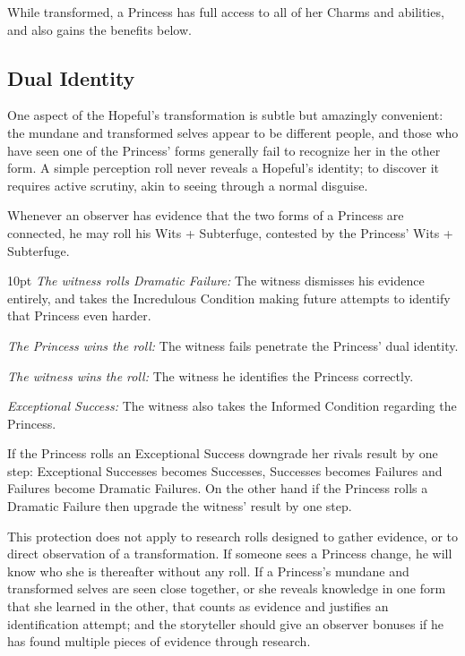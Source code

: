 While transformed, a Princess has full access to all of her Charms and abilities, and also gains the benefits below. 

\subsection*{Dual Identity}
One aspect of the Hopeful's transformation is subtle but amazingly convenient: the mundane and transformed selves appear to be different people, and those who have seen one of the Princess' forms generally fail to recognize her in the other form. A simple perception roll never reveals a Hopeful's identity; to discover it requires active scrutiny, akin to seeing through a normal disguise.

Whenever an observer has evidence that the two forms of a Princess are connected, he may roll his Wits + Subterfuge, contested by the Princess' Wits + Subterfuge. 

\begin{myindentpar}{10pt}
    \emph{The witness rolls Dramatic Failure:} The witness dismisses his evidence entirely, and takes the Incredulous Condition making future attempts to identify that Princess even harder. 
    
    \emph{The Princess wins the roll:} The witness fails penetrate the Princess' dual identity. 
    
    \emph{The witness wins the roll:} The witness he identifies the Princess correctly.
    
    \emph{Exceptional Success:} The witness also takes the Informed Condition regarding the Princess. 
\end{myindentpar}

If the Princess rolls an Exceptional Success downgrade her rivals result by one step: Exceptional Successes becomes Successes, Successes becomes Failures and Failures become Dramatic Failures. On the other hand if the Princess rolls a Dramatic Failure then upgrade the witness' result by one step.

This protection does not apply to research rolls designed to gather evidence, or to direct observation of a transformation. If someone sees a Princess change, he will know who she is thereafter without any roll. If a Princess's mundane and transformed selves are seen close together, or she reveals knowledge in one form that she learned in the other, that counts as evidence and justifies an identification attempt; and the storyteller should give an observer bonuses if he has found multiple pieces of evidence through research. 

